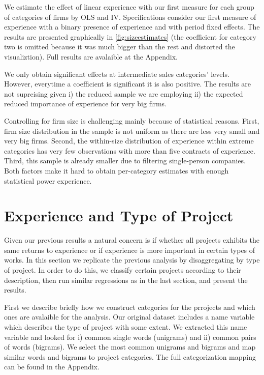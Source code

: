      

     We estimate the effect of linear experience with our first measure for each group of categories of firms by OLS and IV. Specifications consider our first measure of experience with a binary presence of experience and with period fixed effects. The results are presented graphically in \ref{fig:sizeestimates} (the coefficient for category two is omitted because it was much bigger than the rest and distorted the visualiztion). Full results are avalaible at the Appendix.

     We only obtain significant effects at intermediate sales categories' levels. However, everytime a coefficient is significant it is also positive. The results are not supreising given i) the reduced sample we are employing ii) the expected reduced importance of experience for very big firms.

     Controlling for firm size is challenging mainly because of statistical reasons. First, firm size distribution in the sample is not uniform as there are less very small and very big firms. Second, the within-size distribution of experience within extreme categories has very few observations with more than five contracts of experience. Third, this sample is already smaller due to filtering single-person companies. Both factors make it hard to obtain per-category estimates with enough statistical power experience.

     \newpage
     



     \section{Experience and Type of Project}
     Given our previous results a natural concern is if whether all projects exhibits the same returns to experience or if experience is more important in certain types of works. In this section we replicate the previous analysis by disaggregating by type of project. In order to do this, we classify certain projects according to their description, then run similar regressions as in the last section, and present the results.

     First we describe briefly how we construct categories for the prrojects and which ones are avalaible for the analysis. Our original dataset includes a name variable which describes the type of project with some extent. We extracted this name variable and looked for i) common single words (unigrams) and ii) common pairs of words (bigrams). We select the most common unigrams and bigrams and map similar words and bigrams to project categories. The full categorization mapping can be found in the Appendix.


